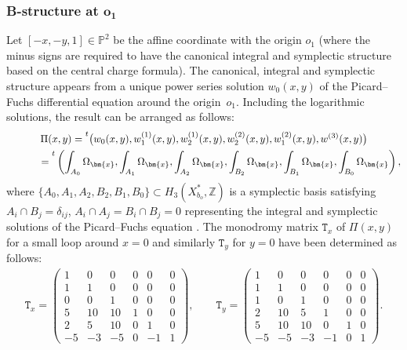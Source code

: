 \documentclass[pdftex]{sigma}
\numberwithin{equation}{section}
\begin{document}
\subsubsection[B-structure at $o_1$]{B-structure at $\boldsymbol{o_1}$} \label{para:B-str-1}
Let $[-x,-y,1]\in\mathbb{P}^{2}$ be the affine coordinate with the origin $o_{1}$ (where the minus signs are required to have the canonical integral and symplectic structure based on the central charge formula). The canonical, integral and symplectic structure appears from a unique power series solution $w_{0}(x,y)$ of the Picard--Fuchs differential equation around the origin~$o_{1}$. Including the logarithmic solutions, the result can be arranged as follows:
\begin{gather}
\Pi(x,y) ={\vphantom{\big(}}^{t}\big(w_{0}(x,y),w_{1}^{(1)}(x,y),
w_{2}^{(1)}(x,y),w_{2}^{(2)}(x,y),w_{1}^{(2)}(x,y),w^{(3)}(x,y)\big)\nonumber\\
\hphantom{\Pi(x,y)}{} = {\vphantom{\Big(}}^{t}
 \left(\int_{A_{0}}\Omega_{\bm{x}},\int_{A_{1}}\Omega_{\bm{x}},
 \int_{A_{2}}\Omega_{\bm{x}},\int_{B_{2}}\Omega_{\bm{x}},\int_{B_{1}}\Omega_{\bm{x}},
 \int_{B_{0}}\Omega_{\bm{x}}\right),\label{eq:PiX}
\end{gather}
where $\{ A_{0},A_{1},A_{2},B_{2},B_{1},B_{0}\} \subset H_{3}(X_{b_{o}}^{*},\mathbb{Z})$ is a symplectic basis satisfying $A_{i}\cap B_{j}=\delta_{ij}$, $A_{i}\cap A_{j}=B_{i}\cap B_{j}=0$ representing the integral and symplectic solutions of the Picard--Fuchs equation \cite[Section~6.3.1]{HTcmp}. The monodromy matrix $\mathtt{T}_{x}$ of $\Pi(x,y)$ for a small loop around $x=0$ and similarly $\mathtt{T}_{y}$ for $y=0$ have been determined as follows:
\begin{gather*}
\mathtt{T}_{x}=\left(\begin{smallmatrix}1 & 0 & 0 & 0 & 0 & 0\\
1 & 1 & 0 & 0 & 0 & 0\\
0 & 0 & 1 & 0 & 0 & 0\\
5 & 10 & 10 & 1 & 0 & 0\\
2 & 5 & 10 & 0 & 1 & 0\\
-5 & -3 & -5 & 0 & -1 & 1
\end{smallmatrix}\right),\qquad \mathtt{T}_{y}=\left(\begin{smallmatrix}1 & 0 & 0 & 0 & 0 & 0\\
1 & 1 & 0 & 0 & 0 & 0\\
1 & 0 & 1 & 0 & 0 & 0\\
2 & 10 & 5 & 1 & 0 & 0\\
5 & 10 & 10 & 0 & 1 & 0\\
-5 & -5 & -3 & -1 & 0 & 1
\end{smallmatrix}\right).
\end{gather*}
\end{document}
